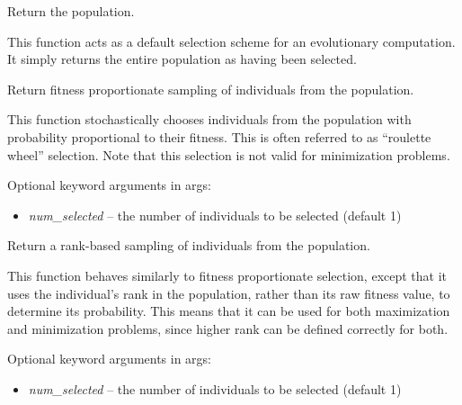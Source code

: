 \documentclass[letterpaper,10pt,english]{sphinxmanual}
\begin{document}
\begin{fulllineitems}
\label{reference:inspyred.ec.selectors.default_selection}
Return the population.

This function acts as a default selection scheme for an evolutionary
computation. It simply returns the entire population as having been 
selected.

\end{fulllineitems}


\begin{fulllineitems}
\label{reference:inspyred.ec.selectors.fitness_proportionate_selection}
Return fitness proportionate sampling of individuals from the population.

This function stochastically chooses individuals from the population
with probability proportional to their fitness. This is often 
referred to as ``roulette wheel'' selection. Note that this selection
is not valid for minimization problems.

Optional keyword arguments in args:
\begin{itemize}
\item {} 
\emph{num\_selected} -- the number of individuals to be selected (default 1)

\end{itemize}

\end{fulllineitems}


\begin{fulllineitems}
\label{reference:inspyred.ec.selectors.rank_selection}
Return a rank-based sampling of individuals from the population.

This function behaves similarly to fitness proportionate selection,
except that it uses the individual's rank in the population, rather
than its raw fitness value, to determine its probability. This
means that it can be used for both maximization and minimization 
problems, since higher rank can be defined correctly for both.

Optional keyword arguments in args:
\begin{itemize}
\item {} 
\emph{num\_selected} -- the number of individuals to be selected (default 1)

\end{itemize}

\end{fulllineitems}
\end{document}

